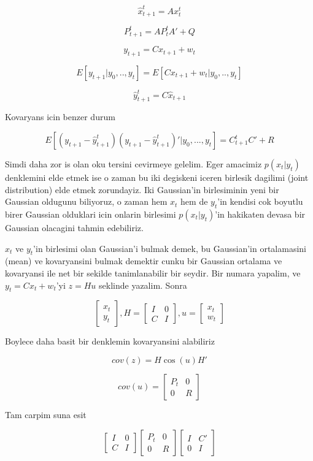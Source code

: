 \documentclass[12pt,fleqn]{article}\usepackage{../common}
\begin{document}
\[ \hat{x}_{t+1}^t = Ax_t^t \]

\[ P_{t+1}^t = AP_t^tA' + Q \]

\[ y_{t+1} = Cx_{t+1} + w_t \]

\[ E[y_{t+1}|y_0,..,y_t] = E[Cx_{t+1} + w_t | y_0,..,y_t] \]

\[ \hat{y}_{t+1}^t = C\hat{x}_{t+1} \]

Kovaryans icin benzer durum

\[ E[(y_{t+1}-\hat{y}_{t+1}^t)(y_{t+1}-\hat{y}_{t+1}^t)' | y_0,...,y_t] = 
C_{t+1}^t C' + R
 \]

Simdi daha zor is olan oku tersini cevirmeye gelelim. Eger amacimiz $p(x_t
 | y_t)$ 
denklemini elde etmek ise o zaman bu iki degiskeni iceren birlesik
dagilimi (joint distribution) elde etmek zorundayiz. Iki Gaussian'in
birlesiminin yeni bir Gaussian oldugunu biliyoruz, o zaman hem $x_t$ hem
de $y_t$'in kendisi cok boyutlu birer Gaussian olduklari icin onlarin
birlesimi $p(x_t |y_t )$'in hakikaten devasa bir Gaussian olacagini tahmin
edebiliriz.

$x_t$ ve $y_t$'in birlesimi olan Gaussian'i bulmak demek, bu Gaussian'in 
ortalamasini (mean) ve kovaryansini bulmak demektir cunku bir Gaussian 
ortalama ve kovaryansi ile net bir sekilde tanimlanabilir bir seydir. 
Bir numara yapalim, ve $y_t = Cx_t + w_t$'yi $z = Hu$ seklinde
yazalim. Sonra 

\[ 
\left[\begin{array}{r}
x_t \\
y_t
\end{array}\right], 
H = 
\left[\begin{array}{rr}
I & 0 \\
C & I
\end{array}\right], 
u = 
\left[\begin{array}{r}
x_t \\
w_t
\end{array}\right]
 \]

Boylece daha basit bir denklemin kovaryansini alabiliriz

\[ cov(z) = H \cos(u) H' \]

\[ 
cov(u) = 
\left[\begin{array}{rr}
P_t & 0 \\
0 & R
\end{array}\right]
 \]

Tam carpim suna esit

\[ 
\left[\begin{array}{rr}
I & 0 \\
C & I
\end{array}\right]
\left[\begin{array}{rr}
P_t & 0 \\
0 & R
\end{array}\right]
\left[\begin{array}{rr}
I & C' \\
0 & I
\end{array}\right]
 \]
\end{document}
